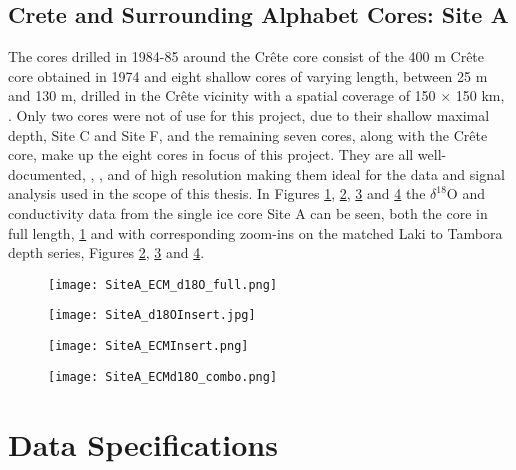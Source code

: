 \documentclass[../../CompleteThesis/Complete_1stDraft]{subfiles}
\begin{document}
	
	\subsection[Crete Area][Crete Area]{Crete and Surrounding Alphabet Cores: Site A}
	\label{Subsec:Data_Selection_Alhabet}
	The cores drilled in 1984-85 around the Crête core consist of the 400 m Crête core obtained in 1974 \cite{bibid} and eight shallow cores of varying length, between 25 m and 130 m, drilled in the Crête vicinity with a spatial coverage of 150 $\times$ 150 km, \cite[Clausen, Gundestrup, Johnsen 1988]{Clausen1988}.
	Only two cores were not of use for this project, due to their shallow maximal depth, Site C and Site F, and the remaining seven cores, along with the Crête core, make up the eight cores in focus of this project. They are all well-documented, \cite[Clausen \& Hammer, 1988]{ClausenHammer1988}, \cite[Clausen, Gundestrup, Johnsen 1988]{Clausen1988}, and of high resolution making them ideal for the data and signal analysis used in the scope of this thesis. In Figures \ref{fig:SiteA__ECM_d18O_full.png}, \ref{fig:SiteA_d18OInsert}, \ref{fig:SiteA_ECMInsert} and \ref{fig:SiteA_ECMd18O_combo} the $\delta^{18}$O and conductivity data from the single ice core Site A can be seen, both the core in full length, \ref{fig:SiteA__ECM_d18O_full.png} and with corresponding zoom-ins on the matched Laki to Tambora depth series, Figures \ref{fig:SiteA_d18OInsert}, \ref{fig:SiteA_ECMInsert} and \ref{fig:SiteA_ECMd18O_combo}.
	\begin{figure}[h]
		\centering
		\texttt{[image: SiteA\_ECM\_d18O\_full.png]}
		\caption[]{}
		\label{fig:SiteA__ECM_d18O_full.png}
	\end{figure}
	
	\begin{figure}[h]
		\centering
		\texttt{[image: SiteA\_d18OInsert.jpg]}
		\caption[]{}
		\label{fig:SiteA_d18OInsert}
	\end{figure}
	
	\begin{figure}[h]
		\centering
		\texttt{[image: SiteA\_ECMInsert.png]}
		\caption[]{}
		\label{fig:SiteA_ECMInsert}
	\end{figure}
	
	\begin{figure}[h]
		\centering
		\texttt{[image: SiteA\_ECMd18O\_combo.png]}
		\caption[]{}
		\label{fig:SiteA_ECMd18O_combo}
	\end{figure}
	
	\section[Data Specifications][Data Specifications]{Data Specifications}
	\label{Sec:Data_Specifications}
	
	
\end{document}
